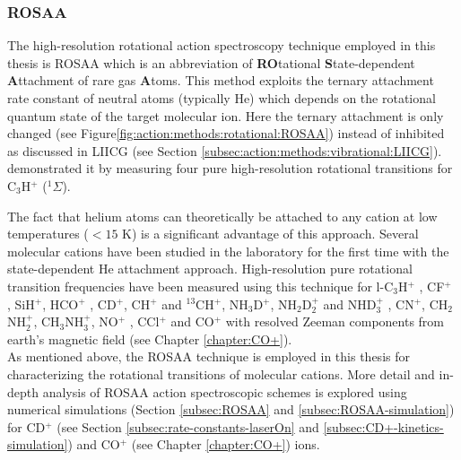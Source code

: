 \subsubsection{ROSAA}
\label{subsec:action:methods:rotational:ROSAA}

The high-resolution rotational action spectroscopy technique
employed in this thesis is ROSAA which is an abbreviation of 
\textbf{RO}tational \textbf{S}tate-dependent \textbf{A}ttachment of rare gas
\textbf{A}toms. This method exploits the ternary attachment rate constant of neutral
atoms (typically He) which depends on the rotational quantum state of the target molecular ion.
Here the ternary attachment is only changed (see
Figure\ref{fig:action:methods:rotational:ROSAA}) instead of inhibited as
discussed in LIICG (see Section \ref{subsec:action:methods:vibrational:LIICG}).
\citet{brunken_laboratory_2014} demonstrated it by measuring four pure
high-resolution rotational transitions for C$_3$H$^+$ ($^1\Sigma$).

The fact that helium atoms can theoretically be attached to any cation at low
temperatures ($<15$ K) is a significant advantage of this approach. Several
molecular cations have been studied in the laboratory for the first time with
the state-dependent He attachment approach. High-resolution pure rotational
transition frequencies have been measured using this technique for l-C$_3$H$^+$
\cite{brunken_laboratory_2014}, CF$^+$ \cite{stoffels_laboratory_2016},
SiH$^+$\cite{domenech2017}, HCO$^+$ \cite{salomon_double_2019},
CD$^+$\cite{Brunken2017}, CH$^+$ and $^{13}$CH$^+$\cite{domenech_first_2018},
NH$_3$D$^+$\cite{stoffels_laboratory_2016, domenech_accurate_2018},
NH$_2$D$_2^+$ and NHD$_3^+$ \cite{domenech_accurate_2018},
CN$^+$\cite{thorwirth_pure_2019}, CH$_2$NH$_2^+$\cite{Markus2019},
CH$_3$NH$_3^+$\cite{schmid_rotational_2022}, NO$^+$
\cite{asvany_fundamental_2021}, CCl$^+$\cite{asvany_pure_2021} and CO$^+$ with
resolved Zeeman components from earth's magnetic field
\cite{marimuthu_zeeman_2022, Brunken2017} (see Chapter \ref{chapter:CO+}).\\

As mentioned above, the ROSAA technique is employed in this thesis for
characterizing the rotational transitions of molecular cations. More detail and
in-depth analysis of ROSAA action spectroscopic schemes is explored using
numerical simulations (Section \ref{subsec:ROSAA} and
\ref{subsec:ROSAA-simulation}) for CD$^+$ (see Section
\ref{subsec:rate-constants-laserOn} and \ref{subsec:CD+-kinetics-simulation})
and CO$^+$ (see Chapter \ref{chapter:CO+}) ions.

